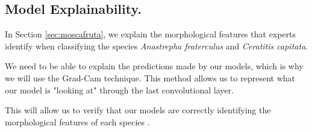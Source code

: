 \subsection{Model Explainability.}

In Section \ref{sec:moscafruta}, we explain the morphological features that experts identify when classifying the species \textit{Anastrepha fraterculus} and \textit{Ceratitis capitata}.

We need to be able to explain the predictions made by our models, which is why we will use the Grad-Cam technique. This method allows us to represent what our model is "looking at" through the last convolutional layer.

This will allow us to verify that our models are correctly identifying the morphological features of each species \cite{24Selvaraju2017}.


